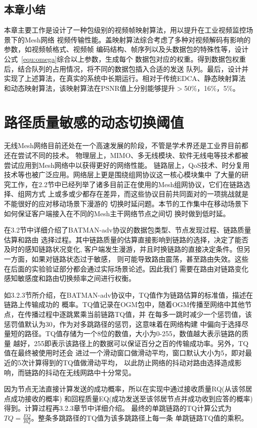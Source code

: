 \subsection{本章小结}
本章主要工作是设计了一种包级别的视频帧映射算法，用以提升在工业视频监控场景下的Mesh网络
视频传输性能。盖映射算法综合考虑了多种对视频解码有影响的参数，如视频帧格式、视频帧
编码结构、帧序列以及头数据包的特殊性等，设计公式~\ref{equ:omega}综合以上参数，生成每个
数据包对应的权重。得到数据包权重后，结合队列的占用情况，将不同的数据包插入合适的发送
队列。最后，设计并实现了上述算法，在真实的系统中长期运行。相对于传统EDCA、静态映射算法
和动态映射算法，该映射算法在PSNR值上分别能够提升$>$50\%，16\%，5\%。


\section{路径质量敏感的动态切换阈值}
无线Mesh网络目前还处在一个高速发展的阶段，不管是学术界还是工业界目前都还在尝试不同的技术。
物理层上，MIMO、多无线模块、软件无线电等技术都被尝试应用到Mesh网络中以获得更好的网络性能。
链路层上，QoS技术、时分复用技术等也被广泛应用。网络层上更是围绕组网协议这一核心模块集中
了大量的研究工作，在2.2节中已经列举了诸多目前正在使用的Mesh组网协议，它们在链路选择、组网方式
上或多或少都存在差异，而这些协议目前共同面对的一项挑战就是不能很好的应对移动场景下漫游的
切换时延问题。本节的工作集中在移动场景下如何保证客户端接入在不同的Mesh主干网络节点之间切
换时做到低时延。

在3.2节中详细介绍了BATMAN-adv协议的数据包类型、节点发现过程、链路质量估算和路由
选择过程。其中链路质量的估算直接影响到链路的选择，决定了能否及时的感知链路状况变化,
客户端发生漫游，并且时换链路的直接决定条件。但另一方面，如果对链路状态过于敏感，
则可能导致路由震荡，甚至路由失效。这些在后面的实验验证部分都会通过实际场景论述。因此我们
需要在路由对链路变化感知敏感度和路由切换频率之间进行权衡。

如3.2.3节所介绍，在BATMAN-adv协议中，TQ值作为链路估算的标准值，描述在链路上传输成功的
概率。TQ值记录在OGM包中，随着OGM传播至网络中其他节点，在传播过程中逐跳累乘当前链路TQ值，并
在每多一跳时减少一个惩罚值，该惩罚值默认为30，作为对多跳路径的惩罚，这意味着在网络构建
中偏向于选择尽量短的路径。TQ值存储为一个8位的数值，大小为0-255，数值越大表示链路的质量
越好，255即表示该路径上的数据可以保证百分之百的传输成功率。另外，TQ值在最终被使用时还会
进过一个滑动窗口做滑动平均，窗口默认大小为5，即对最近的5次计算得到的TQ值做滑动平均，
以此防止网络的抖动对路由选择造成影响，而链路的抖动在无线网路中十分常见。

因为节点无法直接计算发送的成功概率，所以在实现中通过接收质量RQ(从该邻居点成功接收的概率)
和回程质量EQ(成功发送至该邻居节点并成功收到应答的概率)得到。计算过程再3.2.3章节中详细介绍。
最终的单跳链路的TQ计算公式为$TQ=\frac{EQ}{RQ}$。整条多跳路径的TQ值为该多跳路径上每一条
单跳链路TQ值的乘积。

